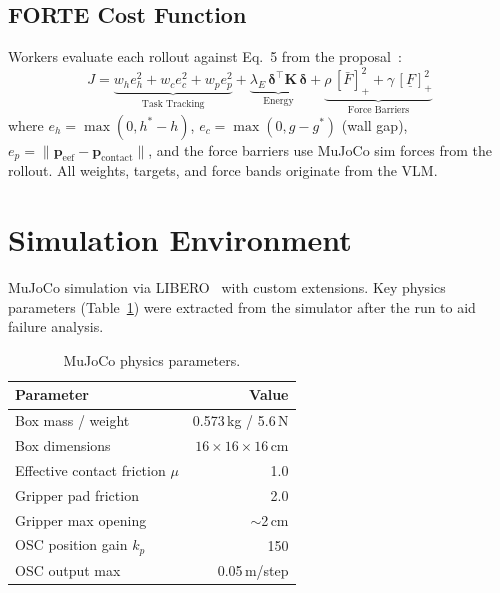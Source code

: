 \documentclass[10pt,twocolumn]{article}
\begin{document}
\subsection{FORTE Cost Function}

Workers evaluate each rollout against Eq.~5 from the proposal~\cite{forte}:
\begin{equation}
J = \underbrace{w_h e_h^2 + w_c e_c^2 + w_p e_p^2}_{\text{Task Tracking}} + \underbrace{\lambda_E\, \boldsymbol{\delta}^\top\!\mathbf{K}\,\boldsymbol{\delta}}_{\text{Energy}} + \underbrace{\rho\,[\bar F]_+^2 + \gamma\,[\underline F]_+^2}_{\text{Force Barriers}}
\label{eq:cost}
\end{equation}
where $e_h{=}\max(0,h^*{-}h)$, $e_c{=}\max(0,g{-}g^*)$ (wall gap), $e_p{=}\|\mathbf{p}_\text{eef}{-}\mathbf{p}_\text{contact}\|$, and the force barriers use MuJoCo sim forces from the rollout. All weights, targets, and force bands originate from the VLM.

\section{Simulation Environment}

MuJoCo simulation via LIBERO~\cite{libero} with custom extensions.  Key physics parameters (Table~\ref{tab:physics}) were extracted from the simulator after the run to aid failure analysis.

\begin{table}[ht]
\centering\small
\caption{MuJoCo physics parameters.}
\begin{tabular}{@{}lr@{}}
\toprule
Parameter & Value \\
\midrule
Box mass / weight & 0.573\,kg / 5.6\,N \\
Box dimensions & $16 \times 16 \times 16$\,cm \\
Effective contact friction $\mu$ & 1.0 \\
Gripper pad friction & 2.0 \\
Gripper max opening & $\sim$2\,cm \\
OSC position gain $k_p$ & 150 \\
OSC output max & 0.05\,m/step \\
\bottomrule
\end{tabular}
\label{tab:physics}
\end{table}
\end{document}

